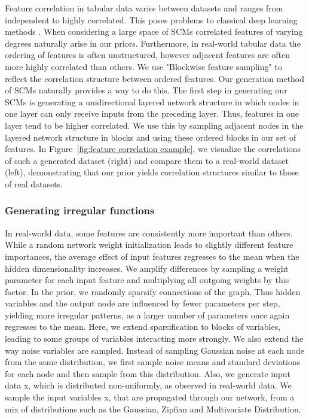 \documentclass{article}
\begin{document}
Feature correlation in tabular data varies between datasets and ranges from independent to highly correlated. This poses problems to classical deep learning methods \citep{nnsfortabular}.
When considering a large space of SCMs correlated features of varying degrees naturally arise in our priors.
Furthermore, in real-world tabular data the ordering of features is often unstructured, however adjacent features are often more highly correlated than others. We use "Blockwise feature sampling" to reflect the correlation structure between ordered features. Our generation method of SCMs naturally provides a way to do this. The first step in generating our SCMs is generating a unidirectional layered network structure in which nodes in one layer can only receive inputs from the preceding layer. Thus, features in one layer tend to be higher correlated. We use this by sampling adjacent nodes in the layered network structure in blocks and using these ordered blocks in our set of features. In Figure~\ref{fig:feature correlation example}, we visualize the correlations of such a generated dataset (right) and compare them to a real-world dataset (left), demonstrating that our prior yields correlation structures similar to those of real datasets.

\subsubsection{Generating irregular functions} \label{app:irregular_funcs}

In real-world data, some features are consistently more important than others. While a random network weight initialization leads to slightly different feature importances, the average effect of input features regresses to the mean when the hidden dimensionality increases. We amplify differences by sampling a weight parameter for each input feature and multiplying all outgoing weights by this factor.
In the prior, we randomly sparsify connections of the graph. Thus hidden variables and the output node are influenced by fewer parameters per step, yielding more irregular patterns, as a larger number of parameters once again regresses to the mean. Here, we extend sparsification to blocks of variables, leading to some groups of variables interacting more strongly.
We also extend the way noise variables are sampled. Instead of sampling Gaussian noise at each node from the same distribution, we first sample noise means and standard deviations for each node and then sample from this distribution.
Also, we generate input data x, which is distributed non-uniformly, as observed in real-world data. We sample the input variables x, that are propagated through our network, from a mix of distributions such as the Gaussian, Zipfian and Multivariate Distribution.
\end{document}
